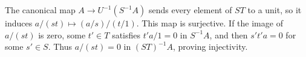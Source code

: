 The canonical map $A\to U^{-1}(S^{-1}A)$ sends every element of $ST$ to a unit, so it induces $a/(st)\mapsto(a/s)/(t/1)$. This map is surjective. If the image of $a/(st)$ is zero, some $t'\in T$ satisfies $t'a/1=0$ in $S^{-1}A$, and then $s't'a=0$ for some $s'\in S$. Thus $a/(st)=0$ in $(ST)^{-1}A$, proving injectivity.
